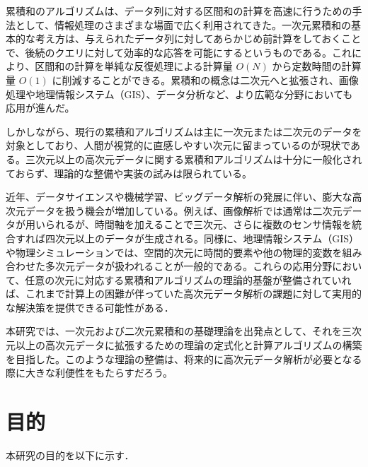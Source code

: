 \documentclass{jsreport}
\theoremstyle{plain} %
\theoremstyle{definition}
\begin{document}
累積和のアルゴリズムは、データ列に対する区間和の計算を高速に行うための手法として、情報処理のさまざまな場面で広く利用されてきた。一次元累積和の基本的な考え方は、与えられたデータ列に対してあらかじめ前計算をしておくことで、後続のクエリに対して効率的な応答を可能にするというものである。これにより、区間和の計算を単純な反復処理による計算量 \({O}(N)\) から定数時間の計算量 \({O}(1)\) に削減することができる。累積和の概念は二次元へと拡張され、画像処理や地理情報システム（GIS）、データ分析など、より広範な分野においても応用が進んだ。

しかしながら、現行の累積和アルゴリズムは主に一次元または二次元のデータを対象としており、人間が視覚的に直感しやすい次元に留まっているのが現状である。三次元以上の高次元データに関する累積和アルゴリズムは十分に一般化されておらず、理論的な整備や実装の試みは限られている。

近年、データサイエンスや機械学習、ビッグデータ解析の発展に伴い、膨大な高次元データを扱う機会が増加している。例えば、画像解析では通常は二次元データが用いられるが、時間軸を加えることで三次元、さらに複数のセンサ情報を統合すれば四次元以上のデータが生成される。同様に、地理情報システム（GIS）や物理シミュレーションでは、空間的次元に時間的要素や他の物理的変数を組み合わせた多次元データが扱われることが一般的である。これらの応用分野において、任意の次元に対応する累積和アルゴリズムの理論的基盤が整備されていれば、これまで計算上の困難が伴っていた高次元データ解析の課題に対して実用的な解決策を提供できる可能性がある．

本研究では、一次元および二次元累積和の基礎理論を出発点として、それを三次元以上の高次元データに拡張するための理論の定式化と計算アルゴリズムの構築を目指した。このような理論の整備は、将来的に高次元データ解析が必要となる際に大きな利便性をもたらすだろう。


\section{目的}

本研究の目的を以下に示す．
\end{document}
